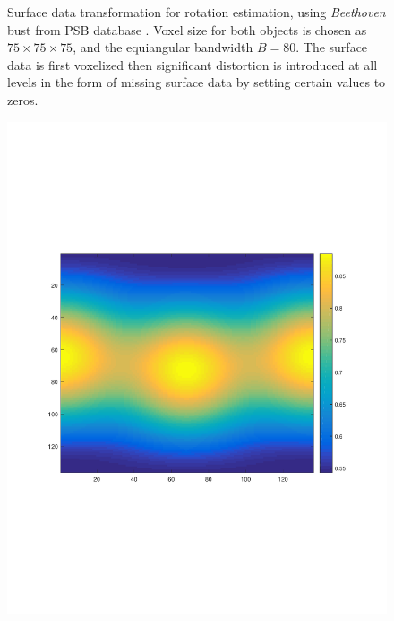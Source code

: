 \documentclass{UCF_ETD}
\begin{document}
\begin{figure}[H]
\begin{center}
\caption{Surface data transformation for rotation estimation, using \emph{Beethoven} bust from PSB database \cite{Princeton2004}. Voxel size for both objects is chosen as $75 \times 75 \times 75$, and the equiangular bandwidth $B = 80$. The surface data is first voxelized then significant distortion is introduced at all levels in the form of missing surface data by setting certain values to zeros. }
\label{SurfaceWithHolesSimulation.fig}
\end{center}
\end{figure}

\begin{figure}[H] 
\begin{center}
\includegraphics[scale=0.3]{RobustRegistration/SphericalImageOriginal_1}

\end{center}
\end{figure}
\end{document}
